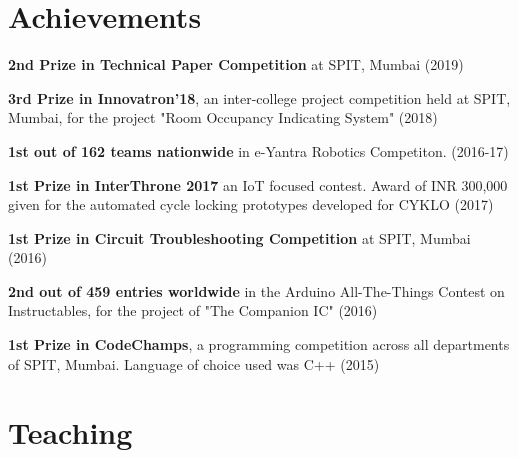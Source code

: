 \documentclass[]{deedy-resume-openfont}
\begin{document}
\hfill
\begin{minipage}[t]{0.66\textwidth} 


\section{Achievements}
\vspace{\topsep} %

\begin{tightemize}
	\item \textbf{2nd Prize in Technical Paper Competition} at SPIT, Mumbai (2019)
	
	\item \textbf{3rd Prize in Innovatron’18}, an inter-college project competition held at SPIT, Mumbai, for the project "Room Occupancy Indicating System" (2018)
	
	\item \textbf{1st out of 162 teams nationwide} in e-Yantra Robotics Competiton. (2016-17)
	
	\item \textbf{1st Prize in InterThrone 2017} an IoT focused contest. Award of INR 300,000 given for the automated cycle locking prototypes developed for CYKLO (2017)
	
	\item \textbf{1st Prize in Circuit Troubleshooting Competition} at SPIT, Mumbai (2016)
	
	
	\item \textbf{2nd out of 459 entries worldwide} in the Arduino All-The-Things Contest on Instructables, for the project of "The Companion IC" \href{https://www.instructables.com/id/The-Companion-IC/}{ \faExternalLink} (2016)
	
	\item \textbf{1st Prize in CodeChamps}, a programming competition across all departments of SPIT, Mumbai. Language of choice used was C++ (2015)
	
\end{tightemize}
\sectionsep


\section{Teaching} 
\begin{tabular}{r L{8.5cm} l}
	

\end{tabular}
\end{minipage}
\end{document}
